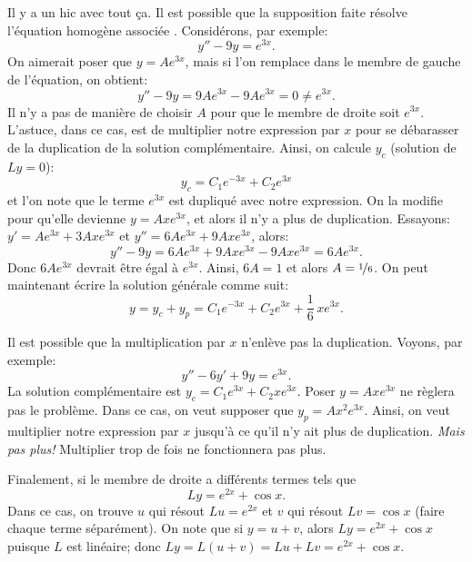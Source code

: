 \medskip

Il y a un hic avec tout ça. 
Il est possible que la supposition faite résolve l'équation homogène associée .  Considérons, par exemple: 
\begin{equation*}
	y'' - 9y = e^{3x} .
\end{equation*}
On aimerait poser que  $y = Ae^{3x}$, mais si l'on remplace dans le membre de gauche de l'équation, on obtient:  
\begin{equation*}
	y''-9y = 9Ae^{3x} - 9Ae^{3x} = 0 \not= e^{3x} .
\end{equation*}
Il n'y a pas de manière de choisir $A$ pour que le membre de droite soit $e^{3x}$.
L'astuce, dans ce cas, est de multiplier notre expression par  $x$ pour se débarasser de la duplication de la solution complémentaire. 
Ainsi, on calcule  $y_c$ (solution de $Ly = 0$): 
\begin{equation*}
	y_c = C_1 e^{-3x} + C_2 e^{3x} 
\end{equation*}
et l'on note que le terme $e^{3x}$ est dupliqué avec notre expression. 
On la modifie pour qu'elle devienne  $y = Axe^{3x}$, et alors il n'y a plus de duplication. 
Essayons:  $y' = Ae^{3x} + 3Axe^{3x}$ et  $y'' = 6Ae^{3x} + 9Axe^{3x}$, alors: 
\begin{equation*}
	y'' -9y = 6Ae^{3x} + 9Axe^{3x} - 9Axe^{3x} = 6Ae^{3x} .
\end{equation*}
Donc $6Ae^{3x}$ devrait être égal à $e^{3x}$.  Ainsi,
$6A = 1$ et alors $A=\nicefrac{1}{6}$.  On peut maintenant écrire la solution générale comme suit: 
\begin{equation*}
	y = y_c + y_p = C_1 e^{-3x} + C_2 e^{3x} + \frac{1}{6}\,xe^{3x} .
\end{equation*}

\medskip

Il est possible que la multiplication  par $x$ n'enlève pas la duplication.  
Voyons, par exemple: 
\begin{equation*}
	y''-6y'+9y = e^{3x} .
\end{equation*}
La solution complémentaire est $y_c = C_1 e^{3x} + C_2 x e^{3x}$.  
Poser $y=A xe^{3x}$ ne règlera pas le problème.  
Dans ce cas, on veut supposer que $y_p = Ax^2e^{3x}$. 
Ainsi, on veut multiplier notre expression par  $x$ jusqu'à ce qu'il n'y ait plus de duplication. 
\emph{Mais pas plus!}  Multiplier trop de fois ne fonctionnera pas plus. 


\medskip

Finalement, si le membre de droite a différents termes tels que 
\begin{equation*}
	Ly = e^{2x} + \cos x .
\end{equation*}
Dans ce cas, on trouve  $u$ qui résout $Lu = e^{2x}$ et $v$ qui résout $Lv = \cos x$ (faire chaque terme séparément).  On note que si $y = u+ v$, alors $Ly = e^{2x} + \cos x$ puisque 
$L$ est linéaire; donc  $Ly = L(u+v) = Lu + Lv = e^{2x} + \cos x$.



